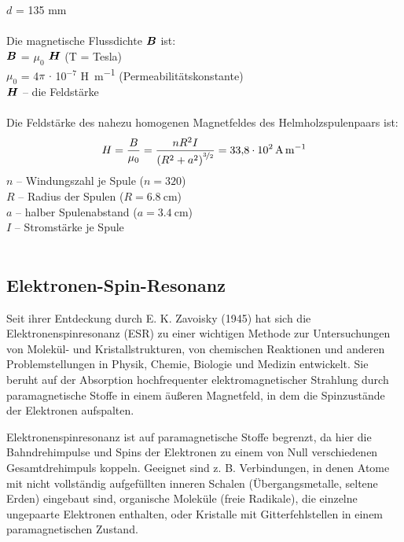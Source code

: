 \documentclass[ngerman]{scrartcl}
\begin{document}
\begin{minipage}[t]{0.6\linewidth}
    \vspace{1cm}
    $d$ = 135 mm\\ \\
    Die magnetische Flussdichte $\vb*{B}$ ist:\\
    $\vb*{B}$ = $\mu_0$ $\vb*{H}$ (T = Tesla)\\
    $\mu_0$ = 4$\pi$ $\cdot$ 10$^{-7}$ \si{\henry\per\meter} (Permeabilitätskonstante)\\
    $\vb*{H}$ -- die Feldstärke\\ \\
    Die Feldstärke des nahezu homogenen Magnetfeldes des Helmholzspulenpaars ist: \\
    \begin{equation}
        {H} = \frac{{B}}{\mu_0} = \frac{n R^2 I}{\left(R^2 + a^2\right)^{\nicefrac{3}{2}}} = \SI{33.8e2}{\ampere\per\meter}
    \end{equation}
    $n$ -- Windungszahl je Spule ($n = 320$)\\
    $R$ -- Radius der Spulen ($R = \SI{6.8}{\centi\meter}$)\\
    $a$ -- halber Spulenabstand ($a = \SI{3.4}{\centi\meter}$)\\
    $I$ -- Stromstärke je Spule\\ \\
\end{minipage}
\setcaphanging


\subsection[Elektronen-Spin-Resonanz]{Elektronen-Spin-Resonanz \cite{ref:angabe_esr}}
\label{subsec:grundlagen_elektronenspinresonanz}
%
Seit ihrer Entdeckung durch E. K. Zavoisky (1945) hat sich die Elektronenspinresonanz (ESR) zu einer wichtigen Methode zur Untersuchungen von Molekül- und Kristallstrukturen, von chemischen Reaktionen und anderen Problemstellungen in Physik, Chemie, Biologie und Medizin entwickelt. Sie beruht auf der Absorption hochfrequenter elektromagnetischer Strahlung durch paramagnetische Stoffe in einem äußeren Magnetfeld, in dem die Spinzustände der Elektronen aufspalten.

Elektronenspinresonanz ist auf paramagnetische Stoffe begrenzt, da hier die Bahndrehimpulse und Spins der Elektronen zu einem von Null verschiedenen Gesamtdrehimpuls koppeln. Geeignet sind z. B. Verbindungen, in denen Atome mit nicht vollständig aufgefüllten inneren Schalen (Übergangsmetalle, seltene Erden) eingebaut sind, organische Moleküle (freie Radikale), die einzelne ungepaarte Elektronen enthalten, oder Kristalle mit Gitterfehlstellen in einem paramagnetischen Zustand.
\end{document}
